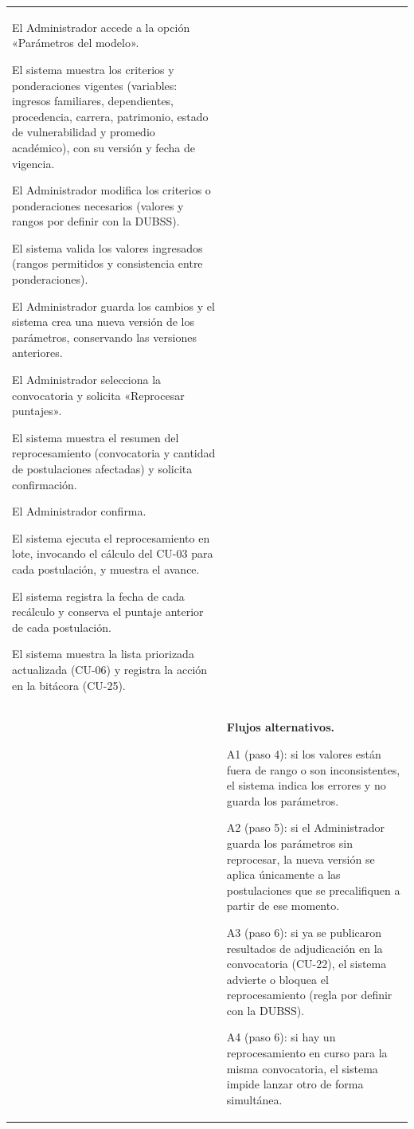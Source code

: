 \begin{longtable}{>{\raggedright\arraybackslash}p{2.9cm} >{\raggedright\arraybackslash}p{12.6cm}}
\begin{cupasos}
    \item El Administrador accede a la opción «Parámetros del modelo».
    \item El sistema muestra los criterios y ponderaciones vigentes (variables: ingresos familiares, dependientes, procedencia, carrera, patrimonio, estado de vulnerabilidad y promedio académico), con su versión y fecha de vigencia.
    \item El Administrador modifica los criterios o ponderaciones necesarios (valores y rangos por definir con la DUBSS).
    \item El sistema valida los valores ingresados (rangos permitidos y consistencia entre ponderaciones).
    \item El Administrador guarda los cambios y el sistema crea una nueva versión de los parámetros, conservando las versiones anteriores.
    \item El Administrador selecciona la convocatoria y solicita «Reprocesar puntajes».
    \item El sistema muestra el resumen del reprocesamiento (convocatoria y cantidad de postulaciones afectadas) y solicita confirmación.
    \item El Administrador confirma.
    \item El sistema ejecuta el reprocesamiento en lote, invocando el cálculo del CU-03 para cada postulación, y muestra el avance.
    \item El sistema registra la fecha de cada recálculo y conserva el puntaje anterior de cada postulación.
    \item El sistema muestra la lista priorizada actualizada (CU-06) y registra la acción en la bitácora (CU-25).
\end{cupasos} \\
 & \textbf{Flujos alternativos.}
\begin{cuvin}
    \item A1 (paso 4): si los valores están fuera de rango o son inconsistentes, el sistema indica los errores y no guarda los parámetros.
    \item A2 (paso 5): si el Administrador guarda los parámetros sin reprocesar, la nueva versión se aplica únicamente a las postulaciones que se precalifiquen a partir de ese momento.
    \item A3 (paso 6): si ya se publicaron resultados de adjudicación en la convocatoria (CU-22), el sistema advierte o bloquea el reprocesamiento (regla por definir con la DUBSS).
    \item A4 (paso 6): si hay un reprocesamiento en curso para la misma convocatoria, el sistema impide lanzar otro de forma simultánea.

\end{cuvin}
\end{longtable}
